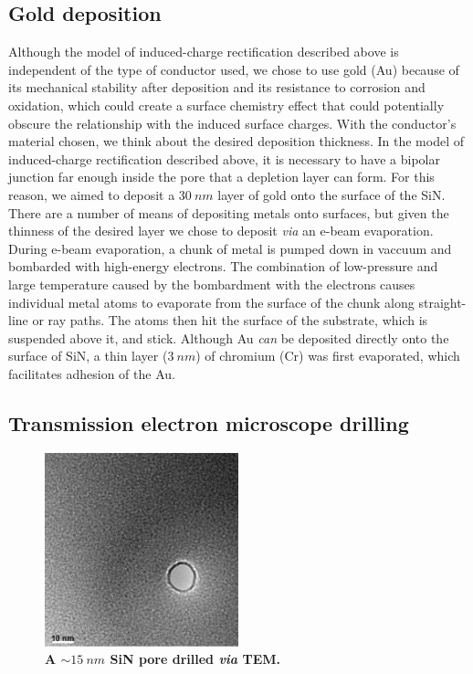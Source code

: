 		\subsection{Gold deposition}
			
			Although the model of induced-charge rectification described above is independent of the type of conductor used, we chose to use gold (Au) because of its mechanical stability after deposition and its resistance to corrosion and oxidation, which could create a surface chemistry effect that could potentially obscure the relationship with the induced surface charges. With the conductor's material chosen, we think about the desired deposition thickness. In the model of induced-charge rectification described above, it is necessary to have a bipolar junction far enough inside the pore that a depletion layer can form. For this reason, we aimed to deposit a $\SI{30}{nm}$ layer of gold onto the surface of the SiN. There are a number of means of depositing metals onto surfaces, but given the thinness of the desired layer we chose to deposit \textit{via} an e-beam evaporation. During e-beam evaporation, a chunk of metal is pumped down in vaccuum and bombarded with high-energy electrons. The combination of low-pressure and large temperature caused by the bombardment with the electrons causes individual metal atoms to evaporate from the surface of the chunk along straight-line or ray paths. The atoms then hit the surface of the substrate, which is suspended above it, and stick. Although Au \textit{can} be deposited directly onto the surface of SiN, a thin layer ($\SI{3}{nm}$) of chromium (Cr) was first evaporated, which facilitates adhesion of the Au.
			
		\subsection{Transmission electron microscope drilling}
		
			\begin{figure}
				\includegraphics[width=0.5\textwidth]{sinpore.png}
				\caption{\textbf{A $\sim\SI{15}{nm}$ SiN pore drilled \textit{via} TEM.}}
				\label{fig:sinpore}
			\end{figure}

